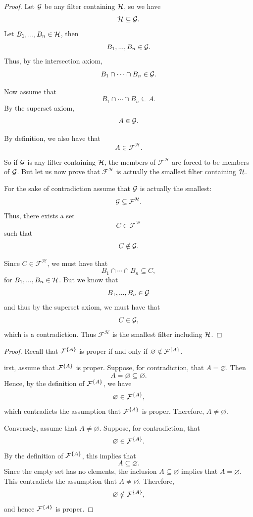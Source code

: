 {\begin{proof}
Let \(\mathcal{G}\) be any filter containing \(\mathcal{H}\), so we have
\[
\mathcal{H} \subseteq \mathcal{G}.
\]
Let \(B_1,...,B_n \in \mathcal{H}\), then
\[
B_1,...,B_n \in \mathcal{G}.
\]
Thus, by the intersection axiom,
\[
B_1 \cap \cdots \cap B_n \in \mathcal{G}.
\]

Now assume that
\[
B_1 \cap \cdots \cap B_n \subseteq A.
\]
By the superset axiom,
\[
A \in \mathcal{G}.
\]

By definition, we also have that
\[
A \in \mathcal{F}^{\mathcal H}.
\]

So if \(\mathcal{G}\) is any filter containing \(\mathcal{H}\), the members of
\(\mathcal{F}^{\mathcal H}\) are forced to be members of \(\mathcal{G}\). But
let us now prove that \(\mathcal{F}^{\mathcal H}\) is actually the smallest
filter containing \(\mathcal{H}\).

For the sake of contradiction assume that \(\mathcal{G}\) is actually the
smallest:
\[
\mathcal{G} \subsetneq \mathcal{F}^{\mathcal H}.
\]
Thus, there exists a set
\[
C \in \mathcal{F}^{\mathcal H}
\]
such that
\[
C \notin \mathcal{G}.
\]

Since \(C \in \mathcal{F}^{\mathcal H}\), we must have that
\[
B_1 \cap \cdots \cap B_n \subseteq C,
\]
for \(B_1,...,B_n \in \mathcal{H}\). But we know that
\[
B_1,...,B_n \in \mathcal{G}
\]
and thus by the superset axiom, we must have that
\[
C \in \mathcal{G},
\]
which is a contradiction. Thus \(\mathcal{F}^{\mathcal H}\) is the smallest
filter including \(\mathcal{H}\).
\end{proof}


\begin{proof}
Recall that \(\mathcal{F}^{\{A\}}\) is proper if and only if
\(\varnothing \notin \mathcal{F}^{\{A\}}\).

irst, assume that \(\mathcal{F}^{\{A\}}\) is proper. Suppose, for
contradiction, that \(A=\varnothing\). Then
\[
A=\varnothing\subseteq\varnothing.
\]
Hence, by the definition of \(\mathcal{F}^{\{A\}}\), we have
\[
\varnothing\in \mathcal{F}^{\{A\}},
\]
which contradicts the assumption that \(\mathcal{F}^{\{A\}}\) is proper.
Therefore, \(A\neq\varnothing\).

Conversely, assume that \(A\neq\varnothing\). Suppose, for
contradiction, that
\[
\varnothing\in \mathcal{F}^{\{A\}}.
\]
By the definition of \(\mathcal{F}^{\{A\}}\), this implies that
\[
A\subseteq\varnothing.
\]
Since the empty set has no elements, the inclusion
\(A\subseteq\varnothing\) implies that \(A=\varnothing\). This
contradicts the assumption that \(A\neq\varnothing\). Therefore,
\[
\varnothing\notin \mathcal{F}^{\{A\}},
\]
and hence \(\mathcal{F}^{\{A\}}\) is proper.
\end{proof}

}
